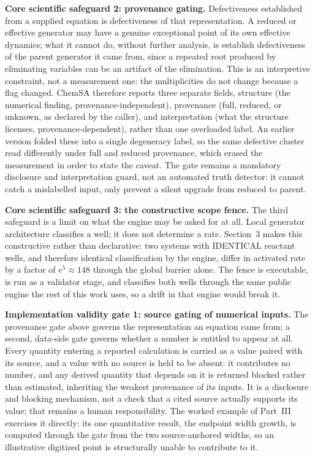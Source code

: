 \textbf{Core scientific safeguard 2: provenance gating.} Defectiveness established from a supplied equation is defectiveness of that representation. A reduced or effective generator may have a genuine exceptional point of its own effective dynamics; what it cannot do, without further analysis, is establish defectiveness of the parent generator it came from, since a repeated root produced by eliminating variables can be an artifact of the elimination. This is an interpretive constraint, not a measurement one: the multiplicities do not change because a flag changed. ChemSA therefore reports three separate fields, structure (the numerical finding, provenance-independent), provenance (full, reduced, or unknown, as declared by the caller), and interpretation (what the structure licenses, provenance-dependent), rather than one overloaded label. An earlier version folded these into a single degeneracy label, so the same defective cluster read differently under full and reduced provenance, which erased the measurement in order to state the caveat. The gate remains a mandatory disclosure and interpretation guard, not an automated truth detector: it cannot catch a mislabelled input, only prevent a silent upgrade from reduced to parent.

\textbf{Core scientific safeguard 3: the constructive scope fence.} The third safeguard is a limit on what the engine may be asked for at all. Local generator architecture classifies a well; it does not determine a rate. Section~3 makes this constructive rather than declarative: two systems with IDENTICAL reactant wells, and therefore identical classification by the engine, differ in activated rate by a factor of $e^{5} \approx 148$ through the global barrier alone. The fence is executable, is run as a validator stage, and classifies both wells through the same public engine the rest of this work uses, so a drift in that engine would break it.

\textbf{Implementation validity gate 1: source gating of numerical inputs.} The provenance gate above governs the representation an equation came from; a second, data-side gate governs whether a number is entitled to appear at all. Every quantity entering a reported calculation is carried as a value paired with its source, and a value with no source is held to be absent: it contributes no number, and any derived quantity that depends on it is returned blocked rather than estimated, inheriting the weakest provenance of its inputs. It is a disclosure and blocking mechanism, not a check that a cited source actually supports its value; that remains a human responsibility. The worked example of Part~III exercises it directly: its one quantitative result, the endpoint width growth, is computed through the gate from the two source-anchored widths, so an illustrative digitized point is structurally unable to contribute to it.

